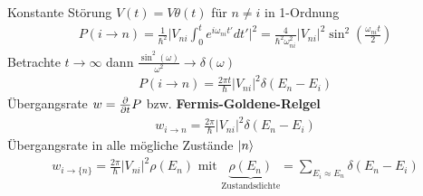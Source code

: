 



{\Huge
Konstante Störung \(V(t)=V\theta(t)\) für \(n\ne i\) in 1-Ordnung
\begin{align*}
P(i\rightarrow n) = \frac{1}{\hbar^2}\Big| V_{ni} \int_{0}^t e^{i\omega_{ni}t'}dt'\Big|^2 = \frac{4}{\hbar^2\omega_{ni}^2}|V_{ni}|^2\sin^2\left(\frac{\omega_{ni} t}{2}\right) 
\end{align*}
Betrachte \(t\to\infty\) dann \(\frac{\sin^2(\omega)}{\omega^2}\to\delta(\omega)\)
\begin{align*}
   P(i\rightarrow n) = \frac{2\pi t}{\hbar} |V_{ni}|^2  \delta(E_n-E_i)
\end{align*}
Übergangsrate \(w = \pdiff_t P\) bzw. \textbf{Fermis-Goldene-Relgel}
\begin{align*}
  \boxed{  w_{i\to n}= \frac{2\pi}{\hbar} |V_{ni}|^2  \delta(E_n-E_i) }
\end{align*}
Übergangsrate in alle mögliche Zustände \(\left| n \right\rangle\)
\begin{align*}
  \boxed{  w_{i\to \{n\}}= \frac{2\pi }{\hbar} |V_{ni}|^2  \rho(E_n) } \text{ mit } \underbrace{\rho(E_n)}_{\text{Zustandsdichte}} = \sum_{E_i\approx E_n}\delta(E_n-E_i)
\end{align*}
}%

